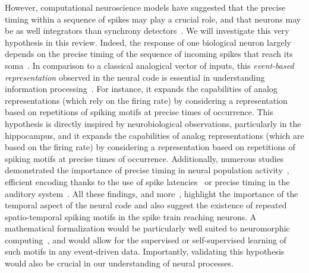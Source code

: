 \documentclass[brainsci, %
               review,submit,pdftex,moreauthors
               ]{Definitions/mdpi}
\begin{document}
However, computational neuroscience models have suggested that the precise timing within a sequence of spikes may play a crucial role, and that neurons may be as well integrators than synchrony detectors~\citep{abeles_role_1982}. We will investigate this very hypothesis in this review. Indeed, the response of one biological neuron largely depends on the precise timing of the sequence of incoming spikes that reach its soma~\citep{paugam-moisy_computing_2012}. In comparison to a classical analogical vector of inputs, this \emph{event-based representation} observed in the neural code is essential in understanding information processing~\citep{carr_processing_1993}. For instance, it expands the capabilities of analog representations (which rely on the firing rate) by considering a representation based on repetitions of spiking motifs at precise times of occurrence. This hypothesis is directly inspired by neurobiological observations, particularly in the hippocampus, and it expands the capabilities of analog representations (which are based on the firing rate) by considering a representation based on repetitions of spiking motifs at precise times of occurrence. Additionally, numerous studies demonstrated the importance of precise timing in neural population activity~\citep{davis_spontaneous_2021}, efficient encoding thanks to the use of spike latencies~\citep{perrinet_coding_2004,gollisch_rapid_2008} or precise timing in the auditory system~\citep{deweese_binary_2003,carr_circuit_1990}. All these findings, and more~\citep{bohte_evidence_2004}, highlight the importance of the temporal aspect of the neural code and also suggest the existence of repeated spatio-temporal spiking motifs in the spike train reaching neurons.  A mathematical formalization would be particularly well suited to neuromorphic computing~\citep{roy_towards_2019}, and would allow for the supervised or self-supervised learning of such motifs in any event-driven data.  Importantly, validating this hypothesis would also be crucial in our understanding of neural processes.
%
\end{document}
